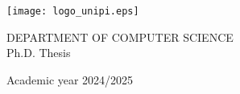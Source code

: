 \begin{titlepage}
	\begin{center}
		\texttt{[image: logo\_unipi.eps]}

		\vspace{1cm}
		\large
		\MakeUppercase{Department of Computer Science}\\
		\vspace{0.4cm}
		{Ph.D. Thesis}

		\vspace{2.5cm}
		\LARGE
		\textbf{\thesistitle}

		\vspace{3cm}
		\Large
		\peopleheader
		\textbf{\authornamefl} \hfill \textbf{\supervisors}

		\vfill
		\large
		{Academic year 2024/2025}
    \end{center}
\end{titlepage}
